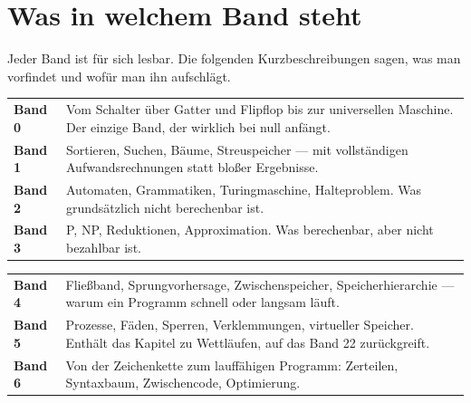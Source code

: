 \begin{center}
\begin{minipage}{0.88\textwidth}
\end{minipage}
\end{center}

\section{Was in welchem Band steht}

Jeder Band ist für sich lesbar. Die folgenden Kurzbeschreibungen sagen, was man vorfindet und wofür man ihn aufschlägt.

\begin{merksatz}
\begin{center}
{\small
\renewcommand{\arraystretch}{1.42}
\begin{tabular}{@{}P{2.2cm}P{6.6cm}@{}}
\toprule
\textbf{Band 0} & Vom Schalter über Gatter und Flipflop bis zur universellen Maschine. Der einzige Band, der wirklich bei null anfängt.\\
\textbf{Band 1} & Sortieren, Suchen, Bäume, Streuspeicher --- mit vollständigen Aufwandsrechnungen statt bloßer Ergebnisse.\\
\textbf{Band 2} & Automaten, Grammatiken, Turingmaschine, Halteproblem. Was grundsätzlich nicht berechenbar ist.\\
\textbf{Band 3} & P, NP, Reduktionen, Approximation. Was berechenbar, aber nicht bezahlbar ist.\\
\bottomrule
\end{tabular}}
\end{center}
\end{merksatz}

\begin{merksatz}
\begin{center}
{\small
\renewcommand{\arraystretch}{1.42}
\begin{tabular}{@{}P{2.2cm}P{6.6cm}@{}}
\toprule
\textbf{Band 4} & Fließband, Sprungvorhersage, Zwischenspeicher, Speicherhierarchie --- warum ein Programm schnell oder langsam läuft.\\
\textbf{Band 5} & Prozesse, Fäden, Sperren, Verklemmungen, virtueller Speicher. Enthält das Kapitel zu Wettläufen, auf das Band 22 zurückgreift.\\
\textbf{Band 6} & Von der Zeichenkette zum lauffähigen Programm: Zerteilen, Syntaxbaum, Zwischencode, Optimierung.\\
\bottomrule
\end{tabular}}
\end{center}
\end{merksatz}

